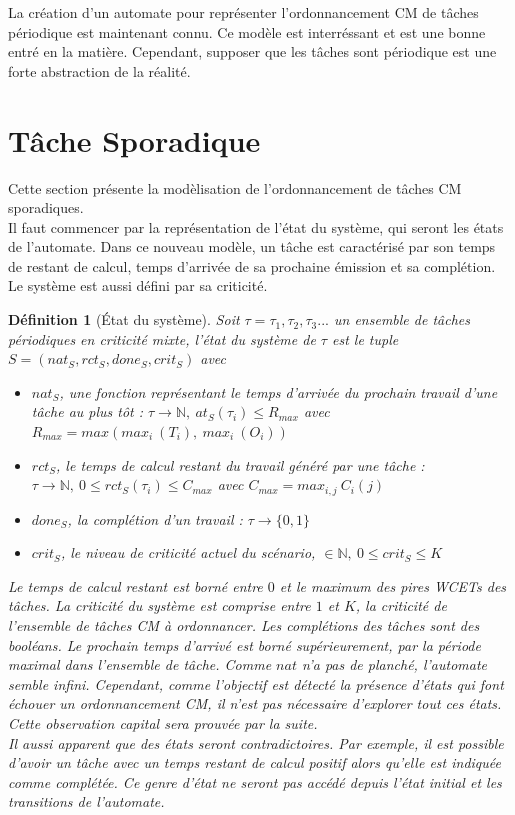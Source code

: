 \documentclass[12pt,a4paper,oneside]{book}
\theoremstyle{break}
\newtheorem{defin}{Définition}[chapter]
\theoremstyle{breakplain}
\begin{document}
La création d'un automate pour représenter l'ordonnancement CM de tâches périodique est maintenant connu. Ce modèle est interréssant et est une bonne entré en la matière. Cependant, supposer que les tâches sont périodique est une forte abstraction de la réalité.

\section{Tâche Sporadique}

Cette section présente la modèlisation de l'ordonnancement de tâches CM sporadiques.\\

Il faut commencer par la représentation de l'état du système, qui seront les états de l'automate. Dans ce nouveau modèle, un tâche est caractérisé par son temps de restant de calcul, temps d'arrivée de sa prochaine émission et sa complétion. Le système est aussi défini par sa criticité.\\


\begin{defin}[État du système]
\label{systemstate}
Soit $\tau = \tau_1, \tau_2, \tau_3 ...$ un ensemble de tâches périodiques en criticité mixte, l'état du système de $\tau$ est le tuple $S = (nat_S, rct_S, done_S, crit_S)$ avec

\begin{itemize}
\item $nat_S$, une fonction représentant le temps d'arrivée du prochain travail d'une tâche au plus tôt : $\tau \rightarrow \mathbb{N},\ at_S(\tau_i) \leq R_{max}$ avec $R_{max} = max(max_i\ (T_i),\ max_i\ (O_i))$
\item $rct_S$, le temps de calcul restant du travail généré par une tâche : $ \tau \rightarrow \mathbb{N},\ 0 \leq rct_S(\tau_i) \leq C_{max}$ avec $C_{max} = max_{i,j}\ C_i(j)$
\item $done_S$, la complétion d'un travail : $ \tau \rightarrow \{0,1\}$
\item $crit_S$, le niveau de criticité actuel du scénario, $ \in \mathbb{N},\ 0 \leq crit_S \leq K$

\end{itemize}

Le temps de calcul restant est borné entre $0$ et le maximum des pires WCETs des tâches. La criticité du système est comprise entre $1$ et $K$, la criticité de l'ensemble de tâches CM à ordonnancer. Les complétions des tâches sont des booléans. Le prochain temps d'arrivé est borné supérieurement, par la période maximal dans l'ensemble de tâche. Comme $nat$ n'a pas de planché, l'automate semble infini. Cependant, comme l'objectif est détecté la présence d'états qui font échouer un ordonnancement CM, il n'est pas nécessaire d'explorer tout ces états. Cette observation capital sera prouvée par la suite.\\
Il aussi apparent que des états seront contradictoires. Par exemple, il est possible d'avoir un tâche avec un temps restant de calcul positif alors qu'elle est indiquée comme complétée. Ce genre d'état ne seront pas accédé depuis l'état initial et les transitions de l'automate.

\end{defin}
\end{document}
